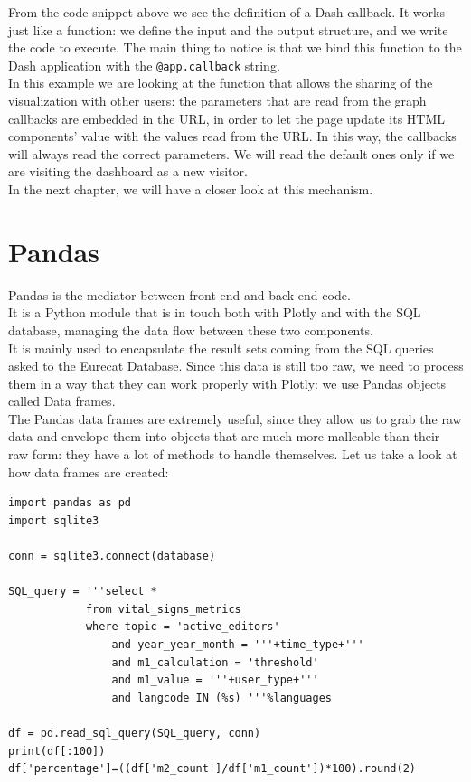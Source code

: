 From the code snippet above we see the definition of a Dash callback.
It works just like a function: we define the input and the output structure, and we write the code to execute. The main thing to notice is that we bind this function to the Dash application with the \verb#@app.callback# string.\\
In this example we are looking at the function that allows the sharing of the visualization with other users: the parameters that are read from the graph callbacks are embedded in the URL, in order to let the page update its HTML components' value with the values read from the URL. In this way, the callbacks will always read the correct parameters. We will read the default ones only if we are visiting the dashboard as a new visitor.\\
In the next chapter, we will have a closer look at this mechanism.\\


\section{Pandas}
\label{sec:pandas}

Pandas is the mediator between front-end and back-end code. \cite{pandas} \\
It is a Python module that is in touch both with Plotly and with the SQL database, managing the data flow between these two components.\\
It is mainly used to encapsulate the result sets coming from the SQL queries asked to the Eurecat Database. Since this data is still too raw, we need to process them in a way that they can work properly with Plotly: we use Pandas objects called Data frames. \\
The Pandas data frames are extremely useful, since they allow us to grab the raw data and envelope them into objects that are much more malleable than their raw form: they have a lot of methods to handle themselves. Let us take a look at how data frames are created:\\

\lstset{frame=lines}
\lstset{basicstyle=\footnotesize}
\lstset{caption=Creating a Pandas data frame}
\begin{lstlisting}
import pandas as pd
import sqlite3

conn = sqlite3.connect(database)

SQL_query = '''select * 
            from vital_signs_metrics 
            where topic = 'active_editors' 
                and year_year_month = '''+time_type+'''
                and m1_calculation = 'threshold' 
                and m1_value = '''+user_type+'''  
                and langcode IN (%s) '''%languages

df = pd.read_sql_query(SQL_query, conn)
print(df[:100])
df['percentage']=((df['m2_count']/df['m1_count'])*100).round(2)
    
\end{lstlisting}

